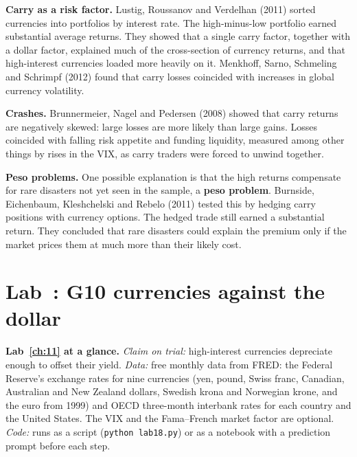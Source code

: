 \textbf{Carry as a risk factor.} Lustig, Roussanov and Verdelhan (2011) sorted currencies into portfolios by interest rate. The high-minus-low portfolio earned substantial average returns. They showed that a single carry factor, together with a dollar factor, explained much of the cross-section of currency returns, and that high-interest currencies loaded more heavily on it. Menkhoff, Sarno, Schmeling and Schrimpf (2012) found that carry losses coincided with increases in global currency volatility.

\textbf{Crashes.} Brunnermeier, Nagel and Pedersen (2008) showed that carry returns are negatively skewed: large losses are more likely than large gains. Losses coincided with falling risk appetite and funding liquidity, measured among other things by rises in the VIX, as carry traders were forced to unwind together.

\textbf{Peso problems.} One possible explanation is that the high returns compensate for rare disasters not yet seen in the sample, a \textbf{peso problem}. Burnside, Eichenbaum, Kleshchelski and Rebelo (2011) tested this by hedging carry positions with currency options. The hedged trade still earned a substantial return. They concluded that rare disasters could explain the premium only if the market prices them at much more than their likely cost.

\section{Lab~\thechapter: G10 currencies against the dollar}
\label{sec:11-lab}

\begin{callout}
\textbf{Lab~\ref{ch:11} at a glance.} \emph{Claim on trial:} high-interest currencies depreciate enough to offset their yield. \emph{Data:} free monthly data from FRED: the Federal Reserve's exchange rates for nine currencies (yen, pound, Swiss franc, Canadian, Australian and New Zealand dollars, Swedish krona and Norwegian krone, and the euro from 1999) and OECD three-month interbank rates for each country and the United States. The VIX and the Fama--French market factor are optional. \emph{Code:} runs as a script (\texttt{python lab18.py}) or as a notebook with a prediction prompt before each step.
\end{callout}

